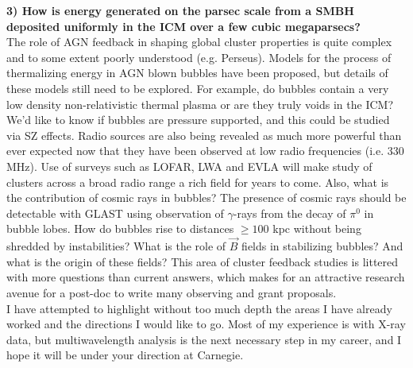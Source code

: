 \documentclass[11pt]{article}
\begin{document}
{\bf 3) How is energy generated on the parsec scale from a SMBH
deposited uniformly in the ICM over a few cubic megaparsecs?}\\
The role of AGN feedback in shaping global cluster
properties is quite complex and to some extent poorly
understood (e.g. Perseus). Models for the process of thermalizing energy in AGN blown
bubbles have been proposed, but details of these models still need to be explored.
For example, do bubbles contain a very low density non-relativistic
thermal plasma or are they truly voids in the ICM? We'd like to know
if bubbles are pressure supported, and this could be studied via SZ
effects. Radio sources are also being revealed as much more powerful
than ever expected now that they have been observed at low radio
frequencies (i.e. 330 MHz). Use of surveys such as LOFAR, LWA and
EVLA will make study of clusters across a broad radio range a rich
field for years to come. Also, what is the contribution of cosmic rays in
bubbles? The presence of cosmic rays should be detectable with GLAST
using observation of $\gamma$-rays from the decay of $\pi^0$ in bubble
lobes. How do bubbles rise to distances $\geq 100$ kpc without being
shredded by instabilities? What is the role of $\vec{B}$ fields in
stabilizing bubbles? And what is the origin of these fields? This area
of cluster feedback studies is littered with more questions than
current answers, which makes for an attractive research avenue for a
post-doc to write many observing and grant proposals.\\

I have attempted to highlight without too much depth the areas I have
already worked and the directions I would like to go. Most of my
experience is with X-ray data, but multiwavelength analysis is the
next necessary step in my career, and I hope it will be under your
direction at Carnegie.
\end{document}
